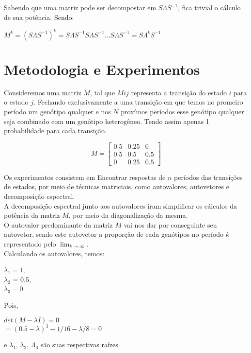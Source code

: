 \documentclass[14pt]{article}
\begin{document}
Sabendo que uma matriz pode ser decompostar em $S\Lambda S^{-1}$, fica trivial o cálculo de sua potência. Sendo:
\begin{center}
    $M^k = (S\Lambda S^{-1})^k = S\Lambda S^{-1} S\Lambda S^{-1} ... S\Lambda S^{-1} = S\Lambda^k S^{-1} $
\end{center}

\section{Metodologia e Experimentos}
\label{sec:metodologia}


Consideremos uma matriz $M$, tal que $Mij$ representa a transição do estado $i$ para o estado $j$. Fechando exclusivamente a uma transição em que temos no promeiro período um genótipo qualquer e nos $N$ proxímos períodos esse genótipo qualquer seja combinado com um genótipo heterogêneo. Tendo assim apenas 1 probabilidade para cada transição. 

\begin{displaymath}
M = \begin{bmatrix}
0.5&0.25&0\\
0.5&0.5&0.5\\
0&0.25&0.5
\end{bmatrix}
\end{displaymath}

Os experimentos consistem em Encontrar respostas de $n$ períodos das transições de estados, por meio de técnicas matriciais, como autovalores, autovetores e decomposição espectral.\\

A decomposição espectral junto aos autovalores iram simplificar os cálculos da potência da matriz $M$, por meio da diagonalização da mesma. \\

O autovalor predominante da matriz $M$ vai nos dar por conseguinte seu autovetor, sendo este autovetor a proporção de cada genótipos no período $k$ representado pelo $\lim_{k\to\infty}$.\\

Calculando os autovalores, temos:
\begin{center}
    $\lambda_1 = 1$,\\ $\lambda_2$ = 0.5,\\ $\lambda_3 = 0$.
\end{center}

Pois,
\begin{center}
    $det(M-\lambda I) = 0$\\
    $= (0.5 - \lambda)^3 - 1/16 - \lambda/8 = 0$
\end{center}
e $\lambda_1$, $\lambda_2$, $\Lambda_3$ são suas respectivas raízes
\end{document}

